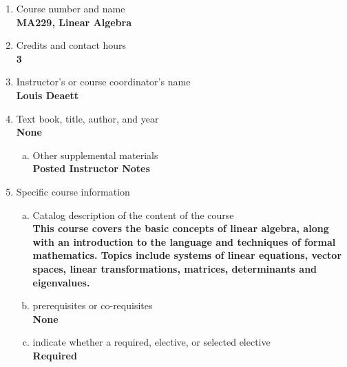 \label{MA229}  %
\begin{enumerate}[1.]
\item Course number and name\\
  {\bfseries
    MA229, Linear Algebra
  }
  
\item Credits and contact hours\\
  {\bfseries
    3  %
  }

\item Instructor's or course coordinator's name\\
  {\bfseries
    Louis Deaett
  }

\item Text book, title, author, and year\\
  {\bfseries
    None    
  }
\begin{enumerate}[a.]
\item Other supplemental materials\\
  {\bfseries
    Posted Instructor Notes
  }
\end{enumerate}

\item Specific course information
\begin{enumerate}[a.]  
\item Catalog description of the content of the course\\
  {\bfseries
This course covers the basic concepts of linear algebra, along with an introduction to the language and techniques of formal mathematics. Topics include systems of linear equations, vector spaces, linear transformations, matrices, determinants and eigenvalues.
}

\item prerequisites or co-requisites\\
  {\bfseries
    None   %
  }

\item indicate whether a required, elective, or selected elective\\ %
  {\bfseries
    Required
  }


\end{enumerate}
\end{enumerate}
